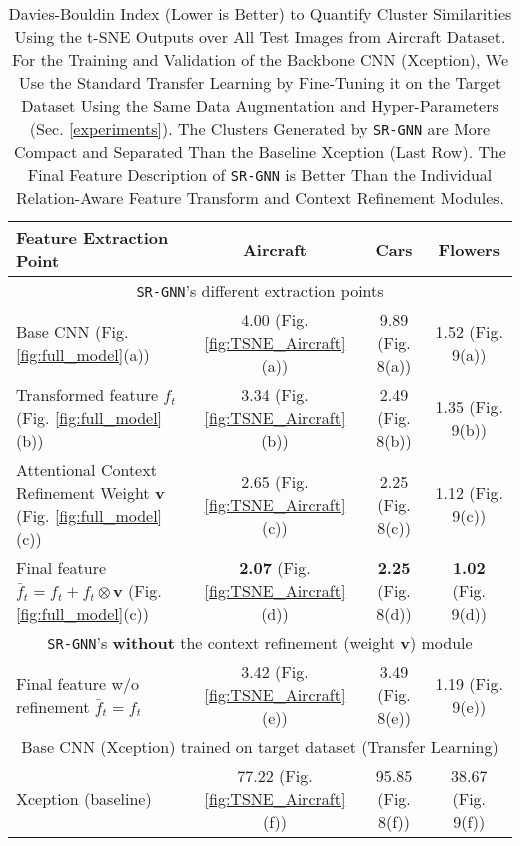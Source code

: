 \documentclass[journal]{IEEEtran}
\begin{document}
\begin{table*}
\begin{center}
\vspace{ -0.2 cm}
\caption{Davies-Bouldin \cite{davies1979cluster} Index (Lower is Better) to Quantify Cluster Similarities Using the t-SNE \cite{van2014accelerating} Outputs over All Test Images from Aircraft 
Dataset. For the Training and Validation of the Backbone CNN (Xception), We Use the Standard Transfer Learning by Fine-Tuning it on the Target Dataset Using the Same Data Augmentation and Hyper-Parameters (Sec. \ref{experiments}). The Clusters Generated by \texttt{SR-GNN} are More Compact and Separated Than the Baseline Xception (Last Row). The Final Feature Description of \texttt{SR-GNN} is Better Than the Individual Relation-Aware Feature Transform  and Context Refinement Modules. }
\begin{tabular}{|l| c c c|}
 \hline
Feature Extraction Point & Aircraft & Cars & Flowers\\
    \toprule
    \multicolumn{4}{|c|}{\texttt{SR-GNN}'s different extraction points}\\
    \midrule
   Base CNN (Fig. \ref{fig:full_model}(a)) &  4.00 (Fig. \ref{fig:TSNE_Aircraft}(a))  & 9.89 (Fig. 8(a)) & 1.52 (Fig. 9(a))\\
   Transformed feature $f_t$ (Fig. \ref{fig:full_model}(b)) &  3.34 (Fig. \ref{fig:TSNE_Aircraft}(b))  & 2.49 (Fig. 8(b))& 1.35 (Fig. 9(b))\\
   Attentional Context Refinement Weight $\mathbf{v}$ (Fig. \ref{fig:full_model}(c)) &  2.65  (Fig. \ref{fig:TSNE_Aircraft}(c)) & 2.25 (Fig. 8(c))  & 1.12 (Fig. 9(c))\\
   Final feature  $\bar{f}_t = f_t + f_t \otimes \mathbf{v}$ (Fig. \ref{fig:full_model}(c)) &  \textbf{2.07} (Fig. \ref{fig:TSNE_Aircraft}(d)) & \textbf{2.25} (Fig. 8(d)) & \textbf{1.02} (Fig. 9(d))\\
   \midrule
   \multicolumn{4}{|c|}{\texttt{SR-GNN}'s  \textbf{without} the context refinement (weight $\mathbf{v}$) module}\\
    \midrule
   Final feature w/o refinement $\bar{f}_t = f_t$ &  3.42 (Fig. \ref{fig:TSNE_Aircraft}(e)) & 3.49 (Fig. 8(e)) & 1.19 (Fig. 9(e))\\
   \midrule
   \multicolumn{4}{|c|}{Base CNN (Xception) trained on target dataset (Transfer Learning)}\\
    \midrule
   Xception (baseline)  & 77.22 (Fig. \ref{fig:TSNE_Aircraft}(f)) & 95.85 (Fig. 8(f)) & 38.67 (Fig. 9(f))  \\
   \bottomrule
\end{tabular}
 \label{table:davies_bouldin_score}
 \end{center}
 \vspace{-0.5 cm}
\end{table*}
\end{document}
